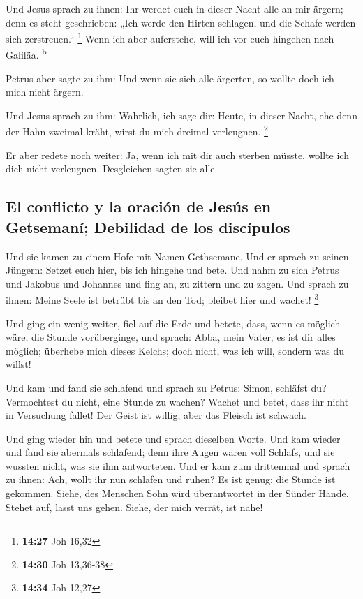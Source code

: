  Und Jesus sprach zu ihnen: Ihr werdet euch in dieser
Nacht alle an mir ärgern; denn es steht geschrieben: „Ich werde den
Hirten schlagen, und die Schafe werden sich zerstreuen.`` \footnote{\textbf{14:27}
  Joh 16,32}  Wenn ich aber auferstehe, will ich vor euch
hingehen nach Galiläa. \textsuperscript{b}

 Petrus aber sagte zu ihm: Und wenn sie sich alle
ärgerten, so wollte doch ich mich nicht ärgern.

 Und Jesus sprach zu ihm: Wahrlich, ich sage dir: Heute,
in dieser Nacht, ehe denn der Hahn zweimal kräht, wirst du mich dreimal
verleugnen. \footnote{\textbf{14:30} Joh 13,36-38}

 Er aber redete noch weiter: Ja, wenn ich mit dir auch
sterben müsste, wollte ich dich nicht verleugnen. Desgleichen sagten sie
alle.

\hypertarget{el-conflicto-y-la-oraciuxf3n-de-jesuxfas-en-getsemanuxed-debilidad-de-los-discuxedpulos}{%
\subsection{El conflicto y la oración de Jesús en Getsemaní; Debilidad
de los
discípulos}\label{el-conflicto-y-la-oraciuxf3n-de-jesuxfas-en-getsemanuxed-debilidad-de-los-discuxedpulos}}

 Und sie kamen zu einem Hofe mit Namen Gethsemane. Und er
sprach zu seinen Jüngern: Setzet euch hier, bis ich hingehe und bete.
 Und nahm zu sich Petrus und Jakobus und Johannes und
fing an, zu zittern und zu zagen.  Und sprach zu ihnen:
Meine Seele ist betrübt bis an den Tod; bleibet hier und wachet!
\footnote{\textbf{14:34} Joh 12,27}

 Und ging ein wenig weiter, fiel auf die Erde und betete,
dass, wenn es möglich wäre, die Stunde vorüberginge,  und
sprach: Abba, mein Vater, es ist dir alles möglich; überhebe mich dieses
Kelchs; doch nicht, was ich will, sondern was du willst!

 Und kam und fand sie schlafend und sprach zu Petrus:
Simon, schläfst du? Vermochtest du nicht, eine Stunde zu wachen?
 Wachet und betet, dass ihr nicht in Versuchung fallet!
Der Geist ist willig; aber das Fleisch ist schwach.

 Und ging wieder hin und betete und sprach dieselben
Worte.  Und kam wieder und fand sie abermals schlafend;
denn ihre Augen waren voll Schlafs, und sie wussten nicht, was sie ihm
antworteten.  Und er kam zum drittenmal und sprach zu
ihnen: Ach, wollt ihr nun schlafen und ruhen? Es ist genug; die Stunde
ist gekommen. Siehe, des Menschen Sohn wird überantwortet in der Sünder
Hände.  Stehet auf, lasst uns gehen. Siehe, der mich
verrät, ist nahe!

